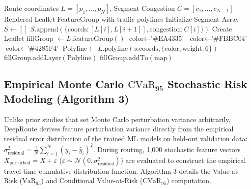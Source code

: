 \documentclass[journal]{IEEEtran}
\begin{document}
\begin{algorithm}[h]
\caption{Multi-Segment Traffic Polyline Rendering}
\begin{algorithmic}[1]
\REQUIRE Route coordinates $L = [p_1, \dots, p_N]$, Segment Congestion $C = [c_1, \dots, c_{N-1}]$
\ENSURE Rendered Leaflet FeatureGroup with traffic polylines
\STATE Initialize Segment Array $S \leftarrow []$
    \STATE $S\text{.append}(\{\text{coords}: [L[i], L[i+1]], \text{congestion}: C[i]\})$
\ENDFOR
\STATE Create Leaflet fillGroup $\leftarrow L.\text{featureGroup}()$
        \STATE $\text{color} \leftarrow \text{'\#EA4335'}$ 
        \STATE $\text{color} \leftarrow \text{'\#FBBC04'}$ 
    \ELSE
        \STATE $\text{color} \leftarrow \text{'\#4285F4'}$ 
    \ENDIF
    \STATE $\text{Polyline} \leftarrow L.\text{polyline}(s.\text{coords}, \{\text{color}, \text{weight}: 6\})$
    \STATE $\text{fillGroup.addLayer}(\text{Polyline})$
\ENDFOR
\RETURN $\text{fillGroup.addTo}(\text{map})$
\end{algorithmic}
\end{algorithm}

\subsection{Empirical Monte Carlo $\text{CVaR}_{95}$ Stochastic Risk Modeling (Algorithm 3)}
Unlike prior studies that set Monte Carlo perturbation variance arbitrarily, DeepRoute derives feature perturbation variance directly from the empirical residual error distribution of the trained ML models on held-out validation data: $\sigma^2_{\text{residual}} = \frac{1}{N} \sum_{i=1}^N (y_i - \hat{y}_i)^2$. During routing, 1,000 stochastic feature vectors $X_{\text{perturbed}} = X + \varepsilon$ ($\varepsilon \sim \mathcal{N}(0, \sigma^2_{\text{residual}})$) are evaluated to construct the empirical travel-time cumulative distribution function. Algorithm 3 details the Value-at-Risk ($\text{VaR}_{95}$) and Conditional Value-at-Risk ($\text{CVaR}_{95}$) \cite{ref34} computation.
\end{document}
